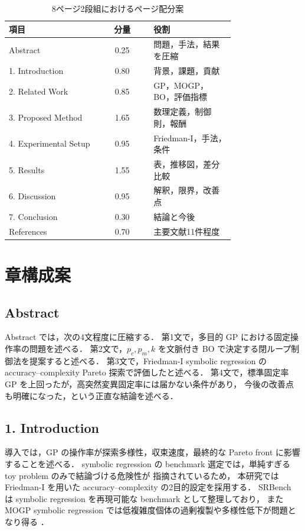 \documentclass[a4paper,10pt,twocolumn]{ltjsarticle}
\newcommand{\pc}{p_c}
\newcommand{\pmut}{p_m}
\begin{document}
\begin{table}[tb]
\centering
\caption{8ページ2段組におけるページ配分案}
\label{tab:page-budget}
\small
\begin{tabular}{@{}p{0.40\linewidth}cp{0.36\linewidth}@{}}
\toprule
項目 & 分量 & 役割 \\
\midrule
Abstract & 0.25 & 問題，手法，結果を圧縮 \\
1. Introduction & 0.80 & 背景，課題，貢献 \\
2. Related Work & 0.85 & GP，MOGP，BO，評価指標 \\
3. Proposed Method & 1.65 & 数理定義，制御則，報酬 \\
4. Experimental Setup & 0.95 & Friedman-I，手法，条件 \\
5. Results & 1.55 & 表，推移図，差分比較 \\
6. Discussion & 0.95 & 解釈，限界，改善点 \\
7. Conclusion & 0.30 & 結論と今後 \\
References & 0.70 & 主要文献11件程度 \\
\bottomrule
\end{tabular}
\end{table}

\section{章構成案}

\subsection{Abstract}

Abstract では，次の4文程度に圧縮する．
第1文で，多目的 GP における固定操作率の問題を述べる．
第2文で，\(\pc,\pmut,k\) を文脈付き BO で決定する閉ループ制御法を提案すると述べる．
第3文で，Friedman-I symbolic regression の accuracy--complexity Pareto 探索で評価したと述べる．
第4文で，標準固定率 GP を上回ったが，高突然変異固定率には届かない条件があり，
今後の改善点も明確になった，という正直な結論を述べる．

\subsection{1. Introduction}

導入では，GP の操作率が探索多様性，収束速度，最終的な Pareto front に影響することを述べる．
symbolic regression の benchmark 選定では，単純すぎる toy problem のみで結論づける危険性が
指摘されているため\cite{mcdermott2012,white2013}，
本研究では Friedman-I を用いた accuracy--complexity の2目的設定を採用する．
SRBench は symbolic regression を再現可能な benchmark として整理しており\cite{lacava2021}，
また MOGP symbolic regression では低複雑度個体の過剰複製や多様性低下が問題となり得る
\cite{liu2022}．
\end{document}
